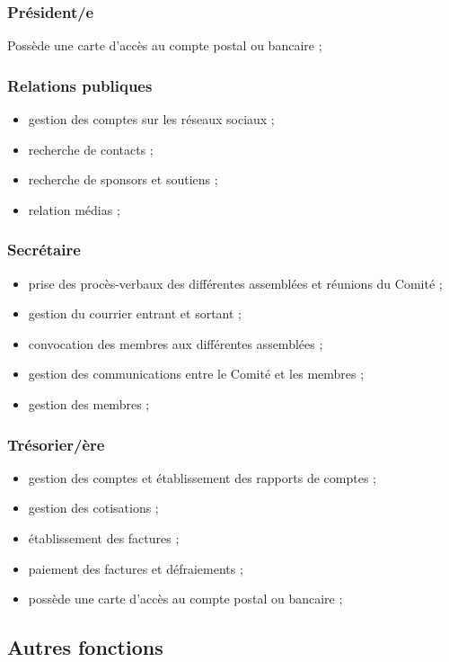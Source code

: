 \documentclass[12pt,twoside]{report}
\begin{document}
\subsubsection*{Président/e}
Possède une carte d’accès au compte postal ou bancaire ;

\subsubsection*{Relations publiques}
\begin{itemize}
\item gestion des comptes sur les réseaux sociaux ;
\item recherche de contacts ;
\item recherche de sponsors et soutiens ;
\item relation médias ;
\end{itemize}

\subsubsection*{Secrétaire}
\begin{itemize}
\item prise des procès-verbaux des différentes assemblées et réunions du Comité ;
\item gestion du courrier entrant et sortant ;
\item convocation des membres aux différentes assemblées ;
\item gestion des communications entre le Comité et les membres ;
\item gestion des membres ;
\end{itemize}

\subsubsection*{Trésorier/ère}
\begin{itemize}
\item gestion des comptes et établissement des rapports de comptes ;
\item gestion des cotisations ;
\item établissement des factures ;
\item paiement des factures et défraiements ;
\item possède une carte d’accès au compte postal ou bancaire ;
\end{itemize}
\newpage
\subsection*{Autres fonctions}
\end{document}
